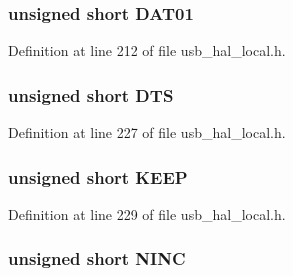 \subsubsection[{D\+A\+T01}]{\setlength{\rightskip}{0pt plus 5cm}unsigned short D\+A\+T01}\label{union___b_d_t___s_e_t_u_p_a101e364982c14c1b233fbe03b15c1d73}


Definition at line 212 of file usb\+\_\+hal\+\_\+local.\+h.

\hypertarget{union___b_d_t___s_e_t_u_p_a69624ece58353b56293b8150da598990}{}
\subsubsection[{D\+T\+S}]{\setlength{\rightskip}{0pt plus 5cm}unsigned short D\+T\+S}\label{union___b_d_t___s_e_t_u_p_a69624ece58353b56293b8150da598990}


Definition at line 227 of file usb\+\_\+hal\+\_\+local.\+h.

\hypertarget{union___b_d_t___s_e_t_u_p_a70b1f74d0c1dfde56ac224bfc0278422}{}
\subsubsection[{K\+E\+E\+P}]{\setlength{\rightskip}{0pt plus 5cm}unsigned short K\+E\+E\+P}\label{union___b_d_t___s_e_t_u_p_a70b1f74d0c1dfde56ac224bfc0278422}


Definition at line 229 of file usb\+\_\+hal\+\_\+local.\+h.

\hypertarget{union___b_d_t___s_e_t_u_p_a177d11889700158408ddca57d2c6be17}{}
\subsubsection[{N\+I\+N\+C}]{\setlength{\rightskip}{0pt plus 5cm}unsigned short N\+I\+N\+C}\label{union___b_d_t___s_e_t_u_p_a177d11889700158408ddca57d2c6be17}


